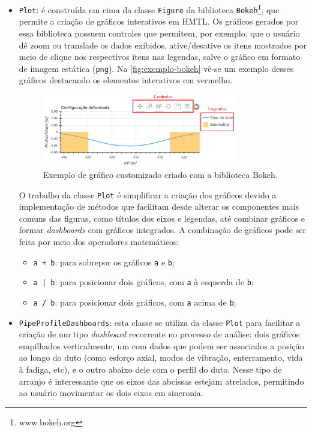 \begin{itemize}

    \item \texttt{Plot}: é construída em cima da classe \texttt{Figure} da biblioteca \texttt{Bokeh}\footnote{www.bokeh.org}, que permite a criação de gráficos interativos em HMTL. Os gráficos gerados por essa biblioteca possuem controles que permitem, por exemplo, que o usuário dê zoom ou translade os dados exibidos, ative/desative os itens mostrados por meio de clique nos respectivos itens nas legendas, salve o gráfico em formato de imagem estática (\texttt{png}). Na \autoref{fig:exemplo-bokeh} vê-se um exemplo desses gráficos destacando os elementos interativos em vermelho.

    \begin{figure}[!ht]
        \centering
        \caption{Exemplo de gráfico customizado criado com a biblioteca Bokeh.}\label{fig:exemplo-bokeh}
        \includegraphics[width=0.8\textwidth]{imagens/exemplo-bokeh}
    \end{figure}

    O trabalho da classe \texttt{Plot} é simplificar a criação dos gráficos devido a implementação de métodos que facilitam desde alterar os componentes mais comuns das figuras, como títulos dos eixos e legendas, até combinar gráficos e formar \textit{dashboards} com gráficos integrados. A combinação de gráficos pode ser feita por meio dos operadores matemáticos:
    \begin{itemize}
        \item \texttt{a + b}: para sobrepor os gráficos \texttt{a} e \texttt{b};
        \item \texttt{a | b}: para posicionar dois gráficos, com \texttt{a} à esquerda de \texttt{b};
        \item \texttt{a / b}: para posicionar dois gráficos, com \texttt{a} acima de \texttt{b};
    \end{itemize}

    \item \texttt{PipeProfileDashboards}: esta classe se utiliza da classe \texttt{Plot} para facilitar a criação de um tipo \textit{dashboard} recorrente no processo de análise: dois gráficos empilhados verticalmente, um com dados que podem ser associados a posição ao longo do duto (como esforço axial, modos de vibração, enterramento, vida à fadiga, etc), e o outro abaixo dele com o perfil do duto. Nesse tipo de arranjo é interessante que os eixos das abcissas estejam atrelados, permitindo ao usuário movimentar os dois eixos em sincronia.
\end{itemize}

